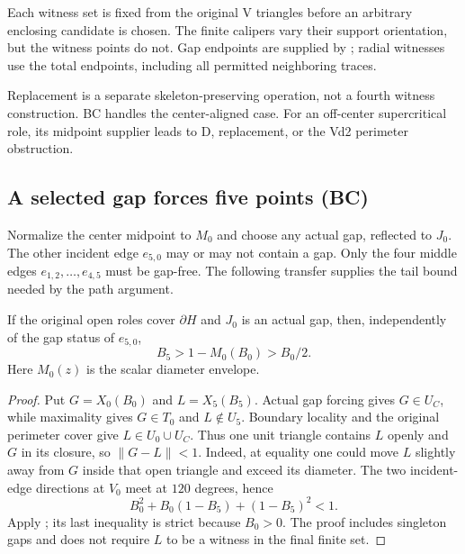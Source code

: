 Each witness set is fixed from the original V triangles before an
arbitrary enclosing candidate is chosen. The finite calipers vary their support orientation, but the witness points do not. Gap endpoints are supplied
by ; radial witnesses use the total endpoints,
including all permitted neighboring traces.







Replacement is a separate skeleton-preserving operation, not a fourth
witness construction. BC handles the center-aligned case. For an off-center
supercritical role, its midpoint supplier leads to D, replacement, or the
Vd2 perimeter obstruction.




\subsection{A selected gap forces five points (BC)}

Normalize the center midpoint to $M_0$ and choose any actual gap, reflected
to $J_0$. The other incident edge $e_{5,0}$ may or may not contain a gap.
Only the four middle edges $e_{1,2},\ldots,e_{4,5}$ must be gap-free.
The following transfer supplies the tail bound needed by the path argument.

\begin{lemma}
\label{lem:shared-gap-anchor-transfer}
If the original open roles cover $\partial H$ and $J_0$ is an actual gap,
then, independently of the gap status of $e_{5,0}$,
\[
 B_5>1-M_0(B_0)>B_0/2.
\]
Here $M_0(z)$ is the scalar diameter envelope.
\end{lemma}
\begin{proof}
Put $G=X_0(B_0)$ and $L=X_5(B_5)$. Actual gap forcing gives
$G\in U_C$, while maximality gives $G\in T_0$ and $L\notin U_5$.
Boundary locality and the original perimeter cover give
$L\in U_0\cup U_C$. Thus one unit triangle contains $L$ openly and
$G$ in its closure, so $\|G-L\|<1$. Indeed, at equality one could move
$L$ slightly away from $G$ inside that open triangle and exceed its diameter.
The two incident-edge directions at $V_0$ meet at $120$ degrees, hence
\[
 B_0^2+B_0(1-B_5)+(1-B_5)^2<1.
\]
Apply ; its last inequality is strict
because $B_0>0$. The proof includes singleton gaps and does not require
$L$ to be a witness in the final finite set.
\end{proof}

